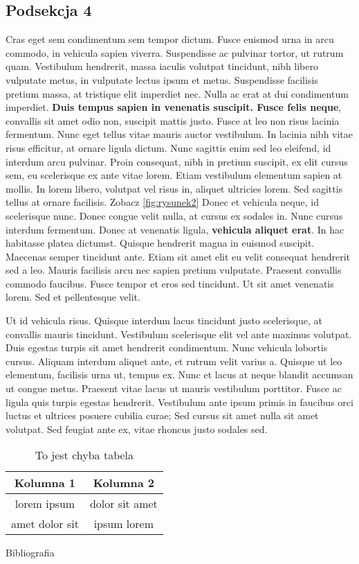 \documentclass[12pt]{article}
\begin{document}
\subsection*{Podsekcja 4}
 Cras eget sem condimentum sem tempor dictum. Fusce euismod urna in arcu commodo, in vehicula sapien viverra. Suspendisse ac pulvinar tortor, ut rutrum quam. Vestibulum hendrerit, massa iaculis volutpat tincidunt, nibh libero vulputate metus, in vulputate lectus ipsum et metus. Suspendisse facilisis pretium massa, at tristique elit imperdiet nec. Nulla ac erat at dui condimentum imperdiet. \textbf{Duis tempus sapien in venenatis suscipit. Fusce felis neque}, convallis sit amet odio non, suscipit mattis justo. Fusce at leo non risus lacinia fermentum. Nunc eget tellus vitae mauris auctor vestibulum. In lacinia nibh vitae risus efficitur, at ornare ligula dictum. Nunc sagittis enim sed leo eleifend, id interdum arcu pulvinar. Proin consequat, nibh in pretium suscipit, ex elit cursus sem, eu scelerisque ex ante vitae lorem. Etiam vestibulum elementum sapien at mollis. In lorem libero, volutpat vel risus in, aliquet ultricies lorem. Sed sagittis tellus at ornare facilisis.
Zobacz \ref{fig:rysunek2}
Donec et vehicula neque, id scelerisque nunc. Donec congue velit nulla, at cursus ex sodales in. Nunc cursus interdum fermentum. Donec at venenatis ligula, \textbf{vehicula aliquet erat}. In hac habitasse platea dictumst. Quisque hendrerit magna in euismod suscipit. Maecenas semper tincidunt ante. Etiam sit amet elit eu velit consequat hendrerit sed a leo. Mauris facilisis arcu nec sapien pretium vulputate. Praesent convallis commodo faucibus. Fusce tempor et eros sed tincidunt. Ut sit amet venenatis lorem. Sed et pellentesque velit. 

Ut id vehicula risus. Quisque interdum lacus tincidunt justo scelerisque, at convallis mauris tincidunt. Vestibulum scelerisque elit vel ante maximus volutpat. Duis egestas turpis sit amet hendrerit condimentum. Nunc vehicula lobortis cursus. Aliquam interdum aliquet ante, et rutrum velit varius a. Quisque ut leo elementum, facilisis urna ut, tempus ex. Nunc et lacus at neque blandit accumsan ut congue metus. Praesent vitae lacus ut mauris vestibulum porttitor. Fusce ac ligula quis turpis egestas hendrerit. Vestibulum ante ipsum primis in faucibus orci luctus et ultrices posuere cubilia curae; Sed cursus sit amet nulla sit amet volutpat. Sed feugiat ante ex, vitae rhoncus justo sodales sed. 

\begin{table}[h]
    \centering
    \begin{tabular}{|c|c|}
        \hline
        Kolumna 1 & Kolumna 2 \\
        \hline
        lorem ipsum &  dolor sit amet\\
        amet dolor sit &  ipsum lorem\\
        \hline
    \end{tabular}
    \caption{To jest chyba tabela}
    \label{tab:tabela1}
\end{table}

\begin{frame}{Bibliografia}
    
     
\end{frame}
\end{document}
